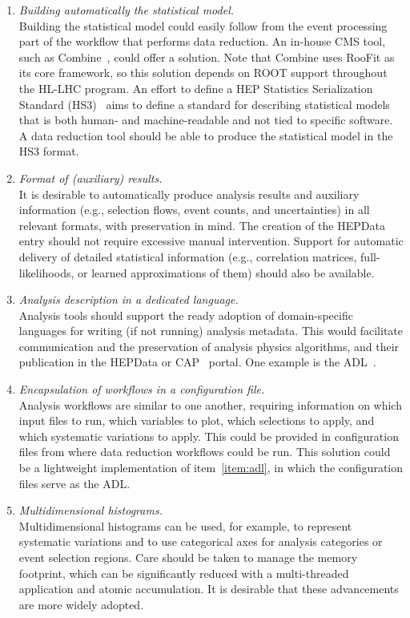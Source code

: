 \begin{enumerate}
\item{} \label{item:stats} {\em Building automatically the statistical model.}\\
Building the statistical model could easily follow from the event processing part of the workflow that performs data reduction. An in-house CMS tool, such as Combine~\cite{combine}, could offer a solution. Note that Combine uses RooFit as its core framework, so this solution depends on \textsc{ROOT} support throughout the HL-LHC program. An effort to define a \gls{HEP} Statistics Serialization Standard (HS3)~\cite{hs3} aims to define a standard for describing statistical models that is both human- and machine-readable and not tied to specific software. A data reduction tool should be able to produce the statistical model in the HS3 format.

\item{} \label{item:hepdata} {\em Format of (auxiliary) results.} \\
It is desirable to automatically produce analysis results and auxiliary information (e.g., selection flows, event counts, and uncertainties) in all relevant formats, with preservation in mind. The creation of the \gls{HEPData}~\cite{Maguire:2017ypu} entry should not require excessive manual intervention. Support for automatic delivery of detailed statistical information (e.g., correlation matrices, full-likelihoods, or learned approximations of them) should also be available.

\item{} \label{item:adl} {\em Analysis description in a dedicated language.}\\ 
Analysis tools should support the ready adoption of domain-specific languages for writing (if not running) analysis metadata. This would facilitate communication and the preservation of analysis physics algorithms, and their publication in the \gls{HEPData} or \gls{CAP}~\cite{cap} portal. One example is the \gls{ADL}~\cite{adl}.

\item{} \label{item:configfile} {\em Encapsulation of workflows in a configuration file.}\\
Analysis workflows are similar to one another, requiring information on which input files to run, which variables to plot, which selections to apply, and which systematic variations to apply. This could be provided in configuration files from where data reduction workflows could be run. This solution could be a lightweight implementation of item~\ref{item:adl}, in which the configuration files serve as the \gls{ADL}.

\item{} \label{item:multihisto} {\em Multidimensional histograms.}\\
Multidimensional histograms can be used, for example, to represent systematic variations and to use categorical axes for analysis categories or event selection regions. Care should be taken to manage the memory footprint, which can be significantly reduced with a multi-threaded application and atomic accumulation. It is desirable that these advancements are more widely adopted.
\end{enumerate}

